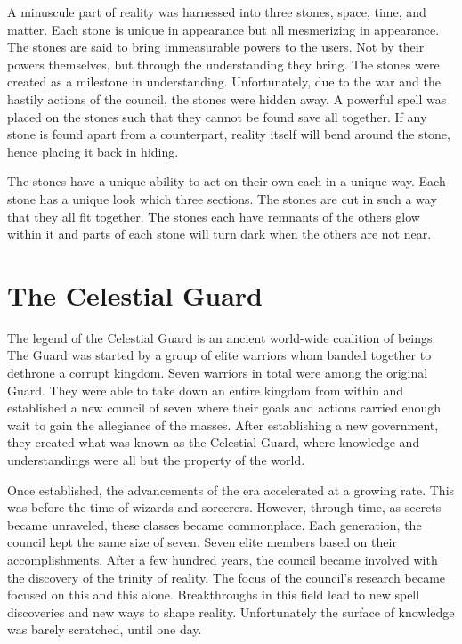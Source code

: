 A minuscule part of reality was harnessed into three stones, space, time, and matter. Each stone is unique in appearance but all mesmerizing in appearance. The stones are said to bring immeasurable powers to the users. Not by their powers themselves, but through the understanding they bring. The stones were created as a milestone in understanding. Unfortunately, due to the war and the hastily actions of the council, the stones were hidden away. A powerful spell was placed on the stones such that they cannot be found save all together. If any stone is found apart from a counterpart, reality itself will bend around the stone, hence placing it back in hiding. 

The stones have a unique ability to act on their own each in a unique way. Each stone has a unique look which three sections. The stones are cut in such a way that they all fit together. The stones each have remnants of the others glow within it and parts of each stone will turn dark when the others are not near. 

\section{The Celestial Guard}

The legend of the Celestial Guard is an ancient world-wide coalition of beings. The Guard was started by a group of elite warriors whom banded together to dethrone a corrupt kingdom. Seven warriors in total were among the original Guard. They were able to take down an entire kingdom from within and established a new council of seven where their goals and actions carried enough wait to gain the allegiance of the masses. After establishing a new government, they created what was known as the Celestial Guard, where knowledge and understandings were all but the property of the world. 

Once established, the advancements of the era accelerated at a growing rate. This was before the time of wizards and sorcerers. However, through time, as secrets became unraveled, these classes became commonplace. Each generation, the council kept the same size of seven. Seven elite members based on their accomplishments. After a few hundred years, the council became involved with the discovery of the trinity of reality. The focus of the council's research became focused on this and this alone. Breakthroughs in this field lead to new spell discoveries and new ways to shape reality. Unfortunately the surface of knowledge was barely scratched, until one day.

